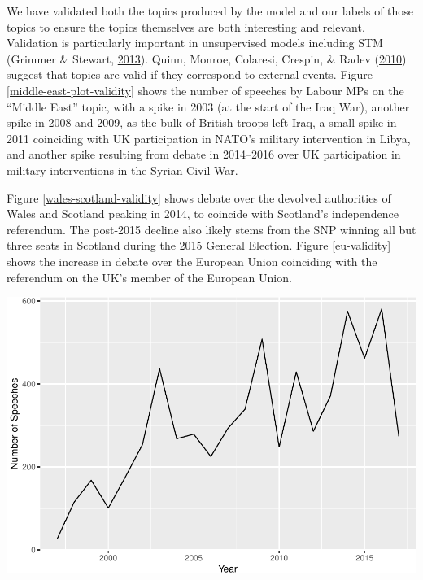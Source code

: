 \documentclass[]{article}
\let\origfigure\figure
\let\endorigfigure\endfigure
\renewenvironment{figure}[1][2] {
    \expandafter\origfigure\expandafter[H]
} {
    \endorigfigure
}
\begin{document}
We have validated both the topics produced by the model and our labels
of those topics to ensure the topics themselves are both interesting and
relevant. Validation is particularly important in unsupervised models
including STM (Grimmer \& Stewart,
\protect\hyperlink{ref-grimmer2013}{2013}). Quinn, Monroe, Colaresi,
Crespin, \& Radev (\protect\hyperlink{ref-quinn2010}{2010}) suggest that
topics are valid if they correspond to external events. Figure
\ref{middle-east-plot-validity} shows the number of speeches by Labour
MPs on the ``Middle East'' topic, with a spike in 2003 (at the start of
the Iraq War), another spike in 2008 and 2009, as the bulk of British
troops left Iraq, a small spike in 2011 coinciding with UK participation
in NATO's military intervention in Libya, and another spike resulting
from debate in 2014--2016 over UK participation in military
interventions in the Syrian Civil War.

Figure \ref{wales-scotland-validity} shows debate over the devolved
authorities of Wales and Scotland peaking in 2014, to coincide with
Scotland's independence referendum. The post-2015 decline also likely
stems from the SNP winning all but three seats in Scotland during the
2015 General Election. Figure \ref{eu-validity} shows the increase in
debate over the European Union coinciding with the referendum on the
UK's member of the European Union.

\begin{figure}
\centering
\includegraphics{methodology_files/figure-latex/middle-east-plot-1.pdf}
\caption{\label{middle-east-plot-validity}Number of Speeches in ``Middle
East'' Topic per Year}
\end{figure}
\end{document}
